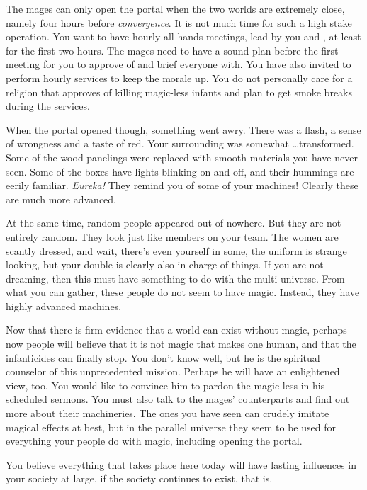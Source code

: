 \documentclass[char]{guildcamp3}
\begin{document}
The mages can only open the portal when the two worlds are extremely close, namely four hours before \emph{convergence}. It is not much time for such a high stake operation. You want to have hourly all hands meetings, lead by you and \cNobleOne{}, at least for the first two hours. The mages need to have a sound plan before the first meeting for you to approve of and brief everyone with. You have also invited \cPaladin{} to perform hourly services to keep the morale up. You do not personally care for a religion that approves of killing magic-less infants and plan to get smoke breaks during the services.

When the portal opened though, something went awry. There was a flash, a sense of wrongness and a taste of red. Your surrounding was somewhat \ldots transformed. Some of the wood panelings were replaced with smooth materials you have never seen. Some of the boxes have lights blinking on and off, and their hummings are eerily familiar. \emph{Eureka!} They remind you of some of your machines! Clearly these are much more advanced. 

At the same time, random people appeared out of nowhere. But they are not entirely random. They look just like members on your team. The women are scantly dressed, and wait, there's even yourself in some, the uniform is strange looking, but your double is clearly also in charge of things. If you are not dreaming, then this must have something to do with the multi-universe. From what you can gather, these people do not seem to have magic. Instead, they have highly advanced machines.

Now that there is firm evidence that a world can exist without magic, perhaps now people will believe that it is not magic that makes one human, and that the infanticides can finally stop. You don't know \cPaladin{} well, but he is the spiritual counselor of this unprecedented mission. Perhaps he will have an enlightened view, too. You would like to convince him to pardon the magic-less in his scheduled sermons. You must also talk to the mages' counterparts and find out more about their machineries. The ones you have seen can crudely imitate magical effects at best, but in the parallel universe they seem to be used for everything your people do with magic, including opening the portal. 

You believe everything that takes place here today will have lasting influences in your society at large, if the society continues to exist, that is.
\end{document}

